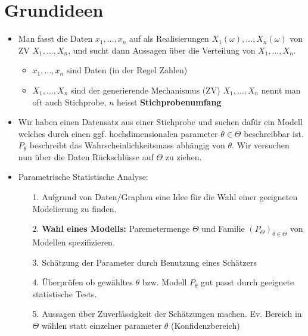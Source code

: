
\section{Grundideen}
\begin{itemize}
    \item Man fasst die Daten $x_1, \dots, x_n$ auf als Realisierungen $X_1(\omega), \dots, X_n(\omega)$ von ZV $X_1, \dots, X_n$, und sucht dann Aussagen über die Verteilung von $X_1, \dots, X_n$.
        \begin{itemize}
            \item $x_1, \dots, x_n$ sind Daten (in der Regel Zahlen)
            \item $X_1, \dots, X_n$ sind der generierende Mechanismus (ZV)
             $X_1, \dots, X_n$ nennt man oft auch Stichprobe, $n$ heisst \textbf{Stichprobenumfang}
        \end{itemize}
    \item Wir haben einen Datensatz aus einer Stichprobe und suchen dafür ein Modell welches durch einen ggf. hochdimensionalen parameter $\theta \in \Theta$ beschreibbar ist. $P_\theta$ beschreibt das Wahrscheinlichkeitsmass abhängig von $\theta$. Wir versuchen nun über die Daten Rückschlüsse auf $\Theta$ zu ziehen.
    \item Parametrische Statistische Analyse:
        \begin{itemize}
            \item[1.] Aufgrund von Daten/Graphen eine Idee für die Wahl einer geeigneten Modelierung zu finden.
            \item[2.] \textbf{Wahl eines Modells:} Paremetermenge $\Theta$ und Familie $(P_\Theta)_{\theta \in \Theta}$ von Modellen spezifizieren.
            \item[3.] Schätzung der Parameter durch Benutzung eines Schätzers
            \item[4.] Überprüfen ob gewähltes $\theta$ bzw. Modell $P_\theta$ gut passt durch geeignete statistische Tests.
            \item[5.] Aussagen über Zuverlässigkeit der Schätzungen machen. Ev. Bereich in $\Theta$ wählen statt einzelner parameter $\theta$ (Konfidenzbereich)
        \end{itemize}
\end{itemize}
